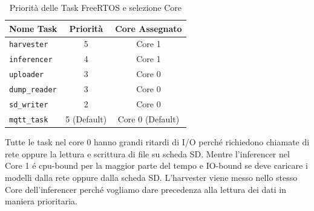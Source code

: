 \begin{table}[H]
	\centering
	\begin{tabularx}{\textwidth}{Xcc}
		\hline
		\textbf{Nome Task} & \textbf{Priorità} & \textbf{Core Assegnato} \\ \hline
		\texttt{harvester}   & 5                 & Core 1                  \\ \hline
		\texttt{inferencer}  & 4                 & Core 1                  \\ \hline
		\texttt{uploader}    & 3                 & Core 0                  \\ \hline
		\texttt{dump\_reader} & 3                 & Core 0                  \\ \hline
		\texttt{sd\_writer}   & 2                 & Core 0                  \\ \hline
		\texttt{mqtt\_task}  & 5 (Default)       & Core 0 (Default)        \\ \hline
	\end{tabularx}
	\caption{Priorità delle Task FreeRTOS e selezione Core}
	\label{tab:freertos_tasks}
\end{table}
Tutte le task nel core 0 hanno grandi ritardi di I/O perché richiedono chiamate di rete oppure la lettura e scrittura di file su scheda SD. Mentre l'inferencer nel Core 1 é cpu-bound per la maggior parte del tempo e IO-bound se deve caricare i modelli dalla rete oppure dalla scheda SD. L'harvester viene messo nello stesso Core dell'inferencer perché vogliamo dare precedenza alla lettura dei dati in maniera prioritaria.

